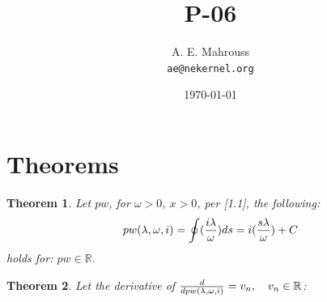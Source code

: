 \documentclass[11pt, a4paper]{article}
\title{P-06}
\author{A. E. Mahrouss\\\texttt{ae@nekernel.org}}
\date{\today}
\theoremstyle{plain}
\newtheorem{theorem}{Theorem}[section]
\theoremstyle{definition}
\theoremstyle{remark}
\begin{document}
\twocolumn[{%
  \maketitle
  \vspace{-0.5em}
  \vspace{0.8em}
  \rule{\linewidth}{0.4pt}
  \vspace{1em}
}]

\maketitle

\section{Theorems}

\begin{theorem}
  Let $pw$, for $\omega > 0$, $x > 0$, per [1.1], the following:
  \begin{equation}
    pw(\lambda, \omega, i) = \oint (\frac{i \lambda}{\omega}) \space ds = i(\frac{s \lambda}{\omega}) + C
  \end{equation}
  holds for: $pw \in \mathbb{R}$.
\end{theorem}

\begin{theorem}
  Let the derivative of $\frac{d}{d\space pw(\lambda, \omega, i) } = v_{n}, \quad v_{n} \in \mathbb{R}$:
\end{theorem}
\end{document}

